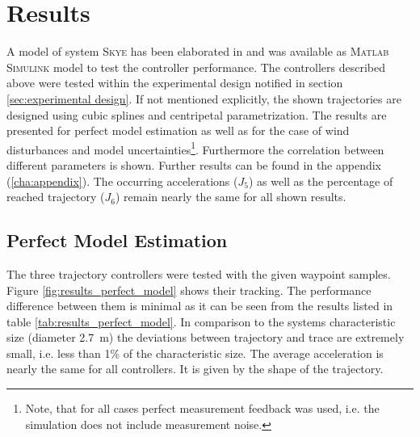 \section{Results}
\label{sec:results}

A model of system \textsc{Skye} has been elaborated in \cite{weichart} and was available as \textsc{Matlab Simulink} model to test the controller performance. The controllers described above were tested within the experimental design notified in section \ref{sec:experimental design}. If not mentioned explicitly, the shown trajectories are designed using cubic splines and centripetal parametrization. The results are presented for perfect model estimation as well as for the case of wind disturbances and model uncertainties\footnote{Note, that for all cases perfect measurement feedback was used, i.e. the simulation does not include measurement noise.}. Furthermore the correlation between different parameters is shown. Further results can be found in the appendix (\ref{cha:appendix}). 
The occurring accelerations ($J_5$) as well as the percentage of reached trajectory ($J_6$) remain nearly the same for all shown results.

\subsection{Perfect Model Estimation}
\label{sub:results_perfect_model}

The three trajectory controllers were tested with the given waypoint samples. Figure \ref{fig:results_perfect_model} shows their tracking. The performance difference between them is minimal as it can be seen from the results listed in table \ref{tab:results_perfect_model}. In comparison to the systems characteristic size (diameter \SI{2.7}{\meter}) the deviations between trajectory and trace are extremely small, i.e. less than 1\% of the characteristic size. The average acceleration is nearly the same for all controllers. It is given by the shape of the trajectory.

